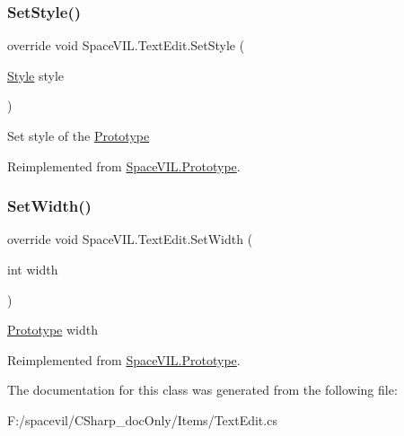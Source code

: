 \subsubsection{\texorpdfstring{Set\+Style()}{SetStyle()}}
{\footnotesize\ttfamily override void Space\+V\+I\+L.\+Text\+Edit.\+Set\+Style (\begin{DoxyParamCaption}\item[{\mbox{\hyperlink{class_space_v_i_l_1_1_decorations_1_1_style}{Style}}}]{style }\end{DoxyParamCaption})\hspace{0.3cm}{\ttfamily [virtual]}}



Set style of the \mbox{\hyperlink{class_space_v_i_l_1_1_prototype}{Prototype}} 



Reimplemented from \mbox{\hyperlink{class_space_v_i_l_1_1_prototype_ae96644a6ace490afb376fb542161e541}{Space\+V\+I\+L.\+Prototype}}.

\mbox{\label{class_space_v_i_l_1_1_text_edit_a5e81be988e48303f9d552bdbe2953027}} 
\subsubsection{\texorpdfstring{Set\+Width()}{SetWidth()}}
{\footnotesize\ttfamily override void Space\+V\+I\+L.\+Text\+Edit.\+Set\+Width (\begin{DoxyParamCaption}\item[{int}]{width }\end{DoxyParamCaption})\hspace{0.3cm}{\ttfamily [virtual]}}



\mbox{\hyperlink{class_space_v_i_l_1_1_prototype}{Prototype}} width 



Reimplemented from \mbox{\hyperlink{class_space_v_i_l_1_1_prototype_a6a4f1b9581f4d18f1c3a3e287d4b2a2b}{Space\+V\+I\+L.\+Prototype}}.



The documentation for this class was generated from the following file\+:\begin{DoxyCompactItemize}
\item 
F\+:/spacevil/\+C\+Sharp\+\_\+doc\+Only/\+Items/Text\+Edit.\+cs\end{DoxyCompactItemize}
